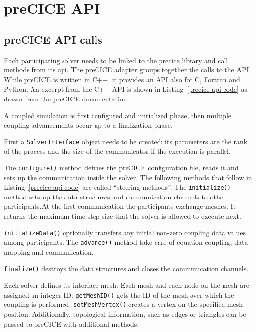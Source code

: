 \chapter{preCICE API}
\label{app:pc-api}

\section{preCICE API calls}
\label{sec:api-code}

Each participating solver needs to be linked to the \acrshort{precice} library and call methods from its \acrfull{api}. The preCICE adapter groups together the calls to the API. While preCICE is written in C++, it provides an API also for C, Fortran and Python. An excerpt from the C++ API is shown in Listing~\ref{precice-api-code} as drawn from the preCICE documentation.

A coupled simulation is first configured and initialized phase, then multiple coupling advancements occur up to a  finalization phase.

First a \texttt{SolverInterface} object needs to be created: its parameters are the rank of the process and the size of the communicator if the execution is parallel.

The \texttt{configure()} method defines the preCICE configuration file, reads it and sets up the communication inside the solver.
The following methods that follow in Listing~\ref{precice-api-code} are called ``steering methods''. The \texttt{initialize()} method sets up the data structures and communication channels to other participants.At the first communication the participants exchange meshes. It returns the maximum time step size that the solver is allowed to
execute next.

\texttt{initializeData()} optionally transfers any initial non-zero coupling data values among participants. The \texttt{advance()} method take care of equation coupling, data
mapping and communication.

\texttt{finalize()} destroys the data structures and closes the communication channels.

Each solver defines its interface mesh. Each mesh and each node on the mesh are assigned an integer ID. \texttt{getMeshID()} gets the ID of the mesh over which the coupling is performed. \texttt{setMeshVertex()} creates a vertex on the specified mesh position. Additionally, topological information, such as edges or triangles can be passed to preCICE with additional methods.

